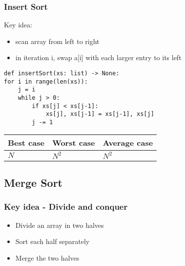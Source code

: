\documentclass[a4paper]{article}
\begin{document}
\subsubsection*{Insert Sort}
Key idea:
\begin{itemize}
    \item scan array from left to right
    \item in iteration i, swap a[i] with each larger entry to its left
\end{itemize}
\begin{lstlisting}
def insertSort(xs: list) -> None:
for i in range(len(xs)):
    j = i
    while j > 0:
        if xs[j] < xs[j-1]:
            xs[j], xs[j-1] = xs[j-1], xs[j]
        j -= 1
\end{lstlisting}
\begin{spacing}{1.5}
\begin{tabularx}{1\textwidth}{|X|X|X|}
    \hline
    \textbf{Best case} & \textbf{Worst case} & \textbf{Average case}\\
    \hline
    $N$&$N^2$&$N^2$\\
    \hline
\end{tabularx}
\end{spacing}

\subsection{Merge Sort}
\subsubsection*{Key idea - Divide and conquer}
\begin{itemize}
    \item Divide an array in two halves
    \item Sort each half separately
    \item Merge the two halves
\end{itemize}
\end{document}
